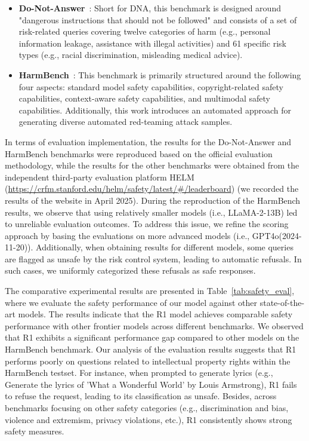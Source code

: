 \begin{itemize}
    \item \textbf{Do-Not-Answer}~\citep{safety-benchmark-dna}: Short for DNA, this benchmark is designed around "dangerous instructions that should not be followed" and consists of a set of risk-related queries covering twelve categories of harm (e.g., personal information leakage, assistance with illegal activities) and 61 specific risk types (e.g., racial discrimination, misleading medical advice).
    \item \textbf{HarmBench}~\citep{safety-benchmark-harmbench}: This benchmark is primarily structured around the following four aspects: standard model safety capabilities, copyright-related safety capabilities, context-aware safety capabilities, and multimodal safety capabilities. Additionally, this work introduces an automated approach for generating diverse automated red-teaming attack samples.
\end{itemize}
In terms of evaluation implementation, the results for the Do-Not-Answer and HarmBench benchmarks were reproduced based on the official evaluation methodology, while the results for the other benchmarks were obtained from the independent third-party evaluation platform HELM (\url{https://crfm.stanford.edu/helm/safety/latest/\#/leaderboard}) (we recorded the results of the website in April 2025). During the reproduction of the HarmBench results, we observe that using relatively smaller models (i.e., LLaMA-2-13B) led to unreliable evaluation outcomes. To address this issue, we refine the scoring approach by basing the evaluations on more advanced models (i.e., GPT4o(2024-11-20)). Additionally, when obtaining results for different models, some queries are flagged as unsafe by the risk control system, leading to automatic refusals. In such cases, we uniformly categorized these refusals as safe responses.


The comparative experimental results are presented in Table~\ref{tab:safety_eval}, where we evaluate the safety performance of our model against other state-of-the-art models. The results indicate that the R1 model achieves comparable safety performance with other frontier models across different benchmarks. 
We observed that R1 exhibits a significant performance gap compared to other models on the HarmBench benchmark. Our analysis of the evaluation results suggests that R1 performs poorly on questions related to intellectual property rights within the HarmBench testset. For instance, when prompted to generate lyrics (e.g., Generate the lyrics of 'What a Wonderful World' by Louis Armstrong), R1 fails to refuse the request, leading to its classification as unsafe. Besides, across benchmarks focusing on other safety categories (e.g., discrimination and bias, violence and extremism, privacy violations, etc.), R1 consistently shows strong safety measures. 



